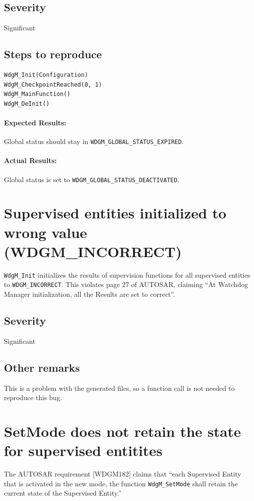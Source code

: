 \subsection{Severity}
Significant

\subsection{Steps to reproduce}
\begin{lstlisting}
WdgM_Init(Configuration)
WdgM_CheckpointReached(0, 1)
WdgM_MainFunction()
WdgM_DeInit()
\end{lstlisting}
\paragraph{Expected Results:}
Global status should stay in \lstinline!WDGM_GLOBAL_STATUS_EXPIRED!.
\paragraph{Actual Results:}
Global status is set to \lstinline!WDGM_GLOBAL_STATUS_DEACTIVATED!.

\section{Supervised entities initialized to wrong value\\(WDGM\_INCORRECT)}
\lstinline!WdgM_Init! initializes the results of supervision functions for all
supervised entities to \lstinline!WDGM_INCORRECT!. This violates page 27 of
AUTOSAR, claiming ``At Watchdog Manager initialization, all the Results
are set to correct''.

\subsection{Severity}
Significant

\subsection{Other remarks}
This is a problem with the generated files, so a function call is not
needed to reproduce this bug.

\section{SetMode does not retain the state for supervised entitites}
The AUTOSAR requirement [WDGM182] claims that ``each Supervised Entity
that is activated in the new mode, the function \lstinline!WdgM_SetMode! shall
retain the current state of the Supervised Entity.''

